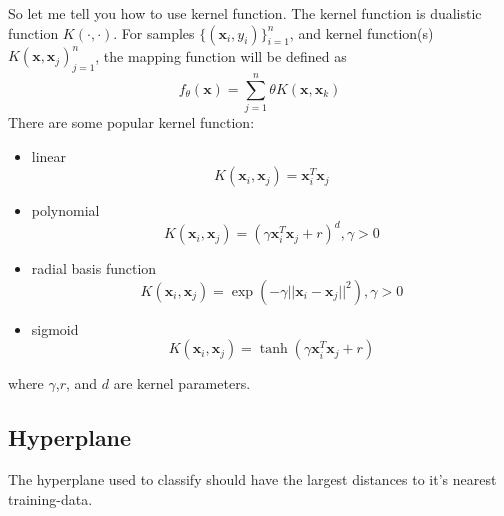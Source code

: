 \documentclass{article}
\begin{document}
So let me tell you how to use kernel function.
The kernel function is dualistic function $K(\cdot,\cdot)$.
For samples $\{(\mathbf{x}_i,y_i)\}^n_{i=1}$, and kernel function(s) $K(\mathbf{x},\mathbf{x}_j)^n_{j=1}$,
the mapping function\cite{GraphML1} will be defined as
\begin{equation}
  \label{eq:mapping}
  f_\theta(\mathbf{x})=\sum\limits_{j=1}^{n}\theta K(\mathbf{x},\mathbf{x}_k)
\end{equation}
There are some popular kernel function:
\begin{itemize}
\item linear
  \begin{equation}
    \label{eq:kf:linear}
    K(\mathbf{x}_i,\mathbf{x}_j) = \mathbf{x}_i^T\mathbf{x}_j
  \end{equation}
\item polynomial
  \begin{equation}
    \label{eq:kf:polynomial}
    K(\mathbf{x}_i,\mathbf{x}_j) = \left(\gamma \mathbf{x}_i^T\mathbf{x}_j+r\right)^d,\gamma > 0
  \end{equation}
\item radial basis function
  \begin{equation}
    \label{eq:kf:rbf}
    K(\mathbf{x}_i,\mathbf{x}_j) = \exp{\left(-\gamma||\mathbf{x}_i-\mathbf{x}_j||^2\right)},\gamma > 0
  \end{equation}
\item sigmoid
  \begin{equation}
    \label{eq:kf:sigmoid}
    K(\mathbf{x}_i,\mathbf{x}_j) = \tanh{\left(\gamma \mathbf{x}_i^T\mathbf{x}_j+r\right)}
  \end{equation}
\end{itemize}
where $\gamma$,$r$, and $d$ are kernel parameters.

\subsection{Hyperplane}
\label{sec:svm:hyperplane}

The hyperplane used to classify should have the largest distances to it's nearest training-data.
\end{document}
